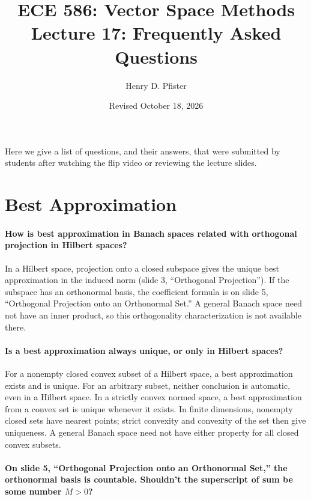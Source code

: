 \documentclass[10pt,english]{article}
\begin{document}
\title{ECE 586: Vector Space Methods \\ Lecture 17: Frequently Asked Questions}
\author{Henry D. Pfister \\ \univ}
\date{Revised October 18, 2026}

\maketitle

Here we give a list of questions, and their answers, that were submitted by students after watching the flip video or reviewing the lecture slides.

\section{Best Approximation}
\paragraph{How is best approximation in Banach spaces related with orthogonal projection in Hilbert spaces?}

In a Hilbert space, projection onto a closed subspace gives the unique best approximation in the induced norm (slide 3, ``Orthogonal Projection'').
If the subspace has an orthonormal basis, the coefficient formula is on slide 5, ``Orthogonal Projection onto an Orthonormal Set.''
A general Banach space need not have an inner product, so this orthogonality characterization is not available there.


\paragraph{Is a best approximation always unique, or only in Hilbert spaces?}

For a nonempty closed convex subset of a Hilbert space, a best approximation exists and is unique.
For an arbitrary subset, neither conclusion is automatic, even in a Hilbert space.
In a strictly convex normed space, a best approximation from a convex set is unique whenever it exists.
In finite dimensions, nonempty closed sets have nearest points; strict convexity and convexity of the set then give uniqueness.
A general Banach space need not have either property for all closed convex subsets.


\paragraph{On slide 5, ``Orthogonal Projection onto an Orthonormal Set,'' the orthonormal basis is countable. Shouldn't the superscript of sum be some number $M>0$?}
\end{document}
